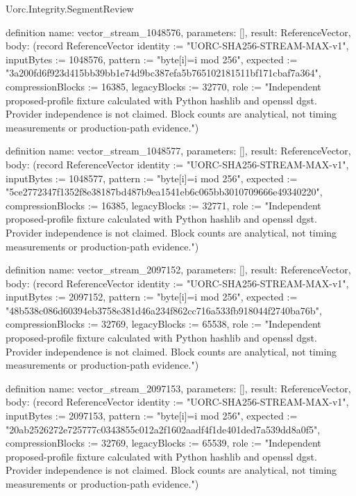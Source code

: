 \begin{lexlean}{Uorc.Integrity.SegmentReview}
\begin{semanticmodule}
definition{
  name: vector_stream_1048576,
  parameters: [],
  result: ReferenceVector,
  body: (record ReferenceVector {identity := "UORC-SHA256-STREAM-MAX-v1", inputBytes := 1048576, pattern := "byte[i]=i mod 256", expected := "3a200fd6f923d415bb39bb1e74d9bc387efa5b765102181511bf171cbaf7a364", compressionBlocks := 16385, legacyBlocks := 32770, role := "Independent proposed-profile fixture calculated with Python hashlib and openssl dgst. Provider independence is not claimed. Block counts are analytical, not timing measurements or production-path evidence."})
}

definition{
  name: vector_stream_1048577,
  parameters: [],
  result: ReferenceVector,
  body: (record ReferenceVector {identity := "UORC-SHA256-STREAM-MAX-v1", inputBytes := 1048577, pattern := "byte[i]=i mod 256", expected := "5ce2772347f1352f8e38187bd487b9ea1541eb6c065bb3010709666e49340220", compressionBlocks := 16385, legacyBlocks := 32771, role := "Independent proposed-profile fixture calculated with Python hashlib and openssl dgst. Provider independence is not claimed. Block counts are analytical, not timing measurements or production-path evidence."})
}

definition{
  name: vector_stream_2097152,
  parameters: [],
  result: ReferenceVector,
  body: (record ReferenceVector {identity := "UORC-SHA256-STREAM-MAX-v1", inputBytes := 2097152, pattern := "byte[i]=i mod 256", expected := "48b538c086d60394eb3758e381d46a234f862cc716a533fb918044f2740ba76b", compressionBlocks := 32769, legacyBlocks := 65538, role := "Independent proposed-profile fixture calculated with Python hashlib and openssl dgst. Provider independence is not claimed. Block counts are analytical, not timing measurements or production-path evidence."})
}

definition{
  name: vector_stream_2097153,
  parameters: [],
  result: ReferenceVector,
  body: (record ReferenceVector {identity := "UORC-SHA256-STREAM-MAX-v1", inputBytes := 2097153, pattern := "byte[i]=i mod 256", expected := "20ab2526272e725777c0343855c012a2f1602aadf4f1de401ded7a539dd8a0f5", compressionBlocks := 32769, legacyBlocks := 65539, role := "Independent proposed-profile fixture calculated with Python hashlib and openssl dgst. Provider independence is not claimed. Block counts are analytical, not timing measurements or production-path evidence."})
}
\end{semanticmodule}
\end{lexlean}

